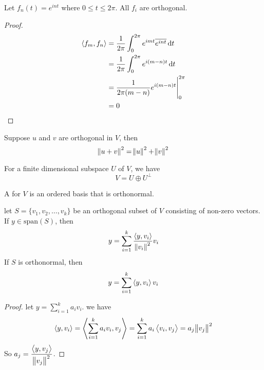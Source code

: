 \begin{theorem}
    Let $f_n (t) = e^{i nt}$ where $0 \leq t \leq 2 \pi$. All $f_i$ are orthogonal.
\end{theorem}
\begin{proof}
    \begin{equation}
        \begin{aligned}
            \innerproduct{f_m}{f_n} &= \frac{1}{2 \pi} \int_0^{2 \pi} e^{imt} \overline{e^{int}} \dif{t} \\
            &= \frac{1}{2\pi} \int_0^{2\pi} e^{i (m-n) t} \dif{t} \\
            &= \eval{\frac{1}{2\pi (m-n)} e^{i(m-n)t}}_0^{2\pi} \\
            &= 0
        \end{aligned}
    \end{equation}
\end{proof}

\begin{theorem}
    Suppose $u$ and $v$ are orthogonal in $V$, then
    \begin{equation}
        \norm{u + v}^2 = \norm{u}^2 + \norm{v}^2
    \end{equation}    
\end{theorem}

\begin{theorem}
    For a finite dimensional subspace $U$ of $V$, we have
    \begin{equation}
        V = U \oplus U^\bot
    \end{equation}        
\end{theorem}



\begin{definition}
	A  for $V$ is an ordered basis that is orthonormal.
\end{definition}

\begin{theorem}
	let $S=\{ v_1, v_2, \dots, v_k \}$ be an orthogonal subset of $V$ consisting of non-zero vectors. If $y \in \text{span}(S)$, then
	\begin{equation}
		y = \sum_{i=1}^k \frac{\left\langle \displaystyle y, v_i \right\rangle}{\norm{v_i}^2} v_i
	\end{equation}
	If $S$ is orthonormal, then
	\begin{equation}
		y = \sum_{i=1}^k \left\langle \displaystyle y, v_i \right\rangle v_i
	\end{equation}
\end{theorem}
\begin{proof}
	let $\displaystyle y = \sum_{i=1}^k a_i v_i$. we have
	\begin{equation*}
		\left\langle \displaystyle y, v_i \right\rangle = \left\langle \displaystyle \sum_{i=1}^k a_i v_i, v_j \right\rangle = \sum_{i=1}^k a_i \left\langle \displaystyle v_i, v_j \right\rangle = a_j \norm{v_j}^2
	\end{equation*}
	So $\displaystyle a_j = \frac{\left\langle \displaystyle y, v_j \right\rangle}{\norm{v_j}^2}$.
	
	
\end{proof}

